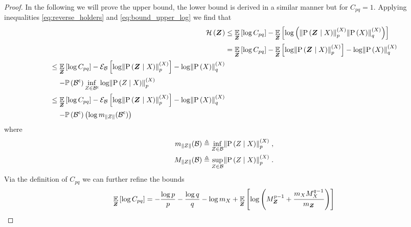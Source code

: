 \begin{proof}
	In the following we will prove the upper bound, the lower bound is derived in a similar manner but for $C_{pq}=1$. Applying inequalities \eqref{eq:reverse_holders} and \eqref{eq:bound_upper_log} we find that
	\begin{align*}
		\entropy{\observationsRV{}} & \leq\expectation{\log C_{pq}}{\observationsRV{}} -\expectation{\log\left(\pnorm{\probcond{\observationsRV{}}{\states{}}}{p}{\states{}}\pnorm{\prob{\states{}}}{q}{\states{}}\right)}{\observationsRV{}} \\
		& =\expectation{\log C_{pq}}{\observationsRV{}}-\expectation{\log \pnorm{\probcond{\observationsRV{}}{\states{}}}{p}{\states{}}}{\observationsRV{}} -\log\pnorm{\prob{\states{}}}{q}{\states{}}           \\
		\begin{split}
			& \leq\expectation{\log C_{pq}}{\observationsRV{}} -\partialexpectation{\log \pnorm{\probcond{\observationsRV{}}{\states{}}}{p}{\states{}}}{\subSpace} -\log\pnorm{\prob{\states{}}}{q}{\states{}} \\
			& \phantomeq-\measure{\stcomp{\subSpace}}\inf_{\observations{}\in\stcomp{\subSpace}}\log \pnorm{\probcond{\observations{}}{\states{}}}{p}{\states{}}
		\end{split}                   \\
		\begin{split}
			& \leq \expectation{\log C_{pq}}{\observationsRV{}}-\partialexpectation{\log \pnorm{\probcond{\observationsRV{}}{\states{}}}{p}{\states{}}}{\subSpace} -\log\pnorm{\prob{\states{}}}{q}{\states{}} \\
			& \phantomeq-\measure{\stcomp{\subSpace}}\left(\log m_{\norm{\observations{}}}(\stcomp{\subSpace})\right)
		\end{split}
	\end{align*}
	where
	\begin{align*}
		m_{\norm{\observations{}}}(\subSpace) & \triangleq\inf_{\observations{}\in\subSpace}\pnorm{\probcond{\observations{}}{\states{}}}{p}{\states{}}\;,
		\\
		M_{\norm{\observations{}}}(\subSpace) & \triangleq\sup_{\observations{}\in\subSpace}\pnorm{\probcond{\observations{}}{\states{}}}{p}{\states{}}\;.
	\end{align*}
	Via the definition of $C_{pq}$ we can further refine the bounds
	\begin{align*}
		\expectation{\log C_{pq}}{\observationsRV{}} & = -\frac{\log p}{p}-\frac{\log q}{q}-\log m_{\states{}}+\expectation{\log \left(M_{\observationsRV{}}^{p-1}+\frac{m_{\states{}}M_{\states{}}^{q-1}}{m_{\observationsRV{}}}\right)}{\observationsRV{}}\\

\end{align*}
\end{proof}

